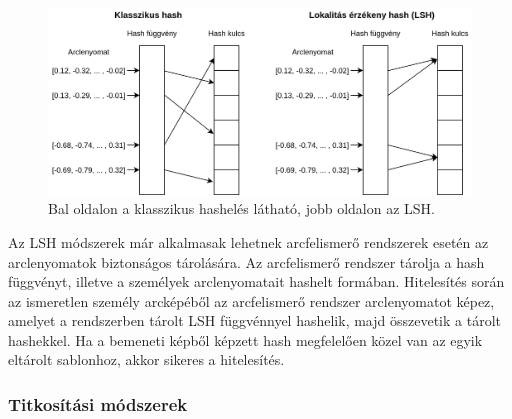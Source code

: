 \begin{figure}[ht]
	\centering
	\includegraphics[width=1\columnwidth]{figures/lsh.png}
	\caption{Bal oldalon a klasszikus hashelés látható, jobb oldalon az LSH.}
	\label{fig:lsh}
\end{figure}

Az LSH módszerek már alkalmasak lehetnek arcfelismerő rendszerek esetén az arclenyomatok biztonságos tárolására. Az arcfelismerő rendszer tárolja a hash függvényt, illetve a személyek arclenyomatait hashelt formában. Hitelesítés során az ismeretlen személy arcképéből az arcfelismerő rendszer arclenyomatot képez, amelyet a rendszerben tárolt LSH függvénnyel hashelik, majd összevetik a tárolt hashekkel. Ha a bemeneti képből képzett hash megfelelően közel van az egyik eltárolt sablonhoz, akkor sikeres a hitelesítés.



\subsubsection{Titkosítási módszerek} %


